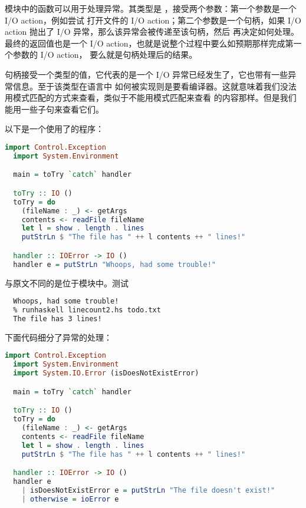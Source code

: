 \documentclass[./main.tex]{subfiles}
\begin{document}
模块中的函数可以用于处理异常。其类型是
，接受两个参数：第一个参数是一个 I/O action，例如尝试
打开文件的 I/O action；第二个参数是一个句柄，如果 I/O action 抛出了 I/O 异常，那么该异常会被传递至该句柄，然后
再决定如何处理。最终的返回值也是一个 I/O action，也就是说整个过程中要么如预期那样完成第一个参数的 I/O action，
要么就是句柄处理后的结果。

句柄接受一个类型的值，它代表的是一个 I/O 异常已经发生了，它也带有一些异常信息。至于该类型在语言中
如何被实现则是要看编译器。这就意味着我们没法用模式匹配的方式来查看，类似于不能用模式匹配来查看
的内容那样。但是我们能用一些子句来查看它们。

以下是一个使用了的程序：

\begin{lstlisting}[language=Haskell]
  import Control.Exception
  import System.Environment

  main = toTry `catch` handler

  toTry :: IO ()
  toTry = do
    (fileName : _) <- getArgs
    contents <- readFile fileName
    let l = show . length . lines
    putStrLn $ "The file has " ++ l contents ++ " lines!"

  handler :: IOError -> IO ()
  handler e = putStrLn "Whoops, had some trouble!"
\end{lstlisting}

与原文不同的是位于模块中。测试

\begin{lstlisting}[language=Bash]
  % runhaskell linecount2.hs xx.txt
  Whoops, had some trouble!
  % runhaskell linecount2.hs todo.txt
  The file has 3 lines!
\end{lstlisting}

下面代码细分了异常的处理：

\begin{lstlisting}[language=Haskell]
  import Control.Exception
  import System.Environment
  import System.IO.Error (isDoesNotExistError)

  main = toTry `catch` handler

  toTry :: IO ()
  toTry = do
    (fileName : _) <- getArgs
    contents <- readFile fileName
    let l = show . length . lines
    putStrLn $ "The file has " ++ l contents ++ " lines!"

  handler :: IOError -> IO ()
  handler e
    | isDoesNotExistError e = putStrLn "The file doesn't exist!"
    | otherwise = ioError e
\end{lstlisting}
\end{document}
